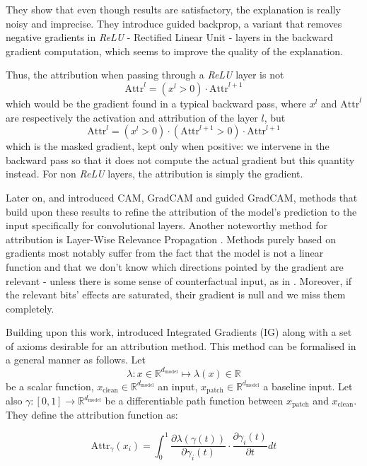 \documentclass{article}
\newcommand{\R}{\mathbb{R}}
\begin{document}
They show that even though results are satisfactory, the explanation is really noisy and imprecise. They introduce guided backprop, a variant that removes negative gradients in \emph{ReLU} - Rectified Linear Unit - layers in the backward gradient computation, which seems to improve the quality of the explanation.

Thus, the attribution when passing through a \emph{ReLU} layer is not
$$ \mathrm{Attr}^l = (x^l > 0) \cdot \mathrm{Attr}^{l+1} $$
which would be the gradient found in a typical backward pass, where $x^l$ and $\mathrm{Attr}^l$ are respectively the activation and attribution of the layer $l$, but
$$ \mathrm{Attr}^l = (x^l > 0) \cdot (\mathrm{Attr}^{l+1} > 0) \cdot \mathrm{Attr}^{l+1} $$
which is the masked gradient, kept only when positive: we intervene in the backward pass so that it does not compute the actual gradient but this quantity instead. For non \emph{ReLU} layers, the attribution is simply the gradient.

Later on, \citet{zhou2016CAM} and \citet{selvaraju2017GradCAM} introduced CAM, GradCAM and guided GradCAM, methods that build upon these results to refine the attribution of the model's prediction to the input specifically for convolutional layers. Another noteworthy method for attribution is Layer-Wise Relevance Propagation \citep{montavon2019layerLRP}. Methods purely based on gradients most notably suffer from the fact that the model is not a linear function and that we don't know which directions pointed by the gradient are relevant - unless there is some sense of counterfactual input, as in \citep{syed2023attributionCircuits}. Moreover, if the relevant bits' effects are saturated, their gradient is null and we miss them completely.

Building upon this work, \citet{sundararajan2017axiomaticIG} introduced Integrated Gradients (IG) along with a set of axioms desirable for an attribution method. This method can be formalised in a general manner as follows. Let
$$\lambda : x \in \R^{d_{\mathrm{model}}} \mapsto \lambda(x) \in \R$$
be a scalar function, $x_{\mathrm{clean}} \in \R^{d_{\mathrm{model}}}$ an input, $x_{\mathrm{patch}} \in \R^{d_{\mathrm{model}}}$ a baseline input. Let also $\gamma : [0, 1] \rightarrow \R^{d_{\mathrm{model}}}$ be a differentiable path function between $x_{\mathrm{patch}}$ and $x_{\mathrm{clean}}$. They define the attribution function as:

$$ \mathrm{Attr}_{\gamma}(x_i) = \int_{0}^{1} \frac{\partial \lambda(\gamma(t))}{\partial \gamma_i(t)} \cdot \frac{\partial \gamma_i(t)}{\partial t} dt $$
\end{document}
